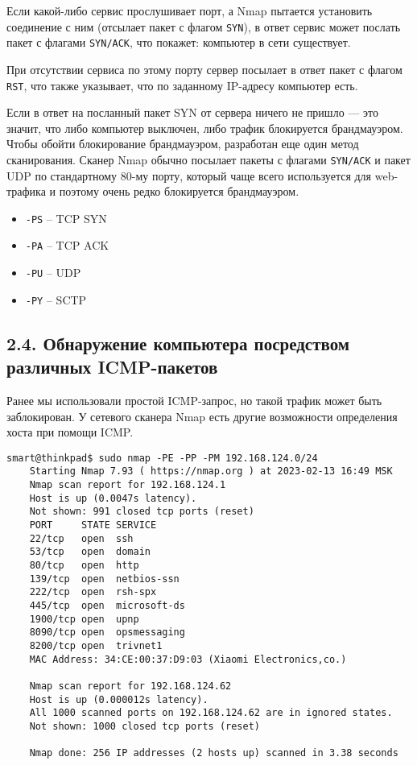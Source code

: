 Если какой-либо сервис прослушивает порт, а Nmap пытается установить соединение с ним (отсылает пакет с флагом \texttt{SYN}), в ответ сервис может послать пакет с флагами \texttt{SYN/ACK}, что покажет: компьютер в сети существует.

При отсутствии сервиса по этому порту сервер посылает в ответ пакет с флагом \texttt{RST}, что также указывает, что по заданному IP-адресу компьютер есть.

Если в ответ на посланный пакет SYN от сервера ничего не пришло — это значит, что либо компьютер выключен, либо трафик блокируется брандмауэром. Чтобы обойти блокирование брандмауэром, разработан еще один метод сканирования. Сканер Nmap обычно посылает пакеты с флагами \texttt{SYN/ACK} и пакет UDP по стандартному 80-му порту, который чаще всего используется для web-трафика и поэтому очень редко блокируется брандмауэром.

\begin{itemize}
    \item \texttt{-PS} -- TCP SYN
    \item \texttt{-PA} -- TCP ACK
    \item \texttt{-PU} -- UDP
    \item \texttt{-PY} -- SCTP
\end{itemize}

\subsection*{2.4. Обнаружение компьютера посредством различных ICMP-пакетов}

Ранее мы использовали простой ICMP-запрос, но такой трафик может быть заблокирован. У сетевого сканера Nmap есть другие возможности определения хоста при помощи ICMP.


\begin{Verbatim}[frame=single]
    smart@thinkpad$ sudo nmap -PE -PP -PM 192.168.124.0/24
    Starting Nmap 7.93 ( https://nmap.org ) at 2023-02-13 16:49 MSK
    Nmap scan report for 192.168.124.1
    Host is up (0.0047s latency).
    Not shown: 991 closed tcp ports (reset)
    PORT     STATE SERVICE
    22/tcp   open  ssh
    53/tcp   open  domain
    80/tcp   open  http
    139/tcp  open  netbios-ssn
    222/tcp  open  rsh-spx
    445/tcp  open  microsoft-ds
    1900/tcp open  upnp
    8090/tcp open  opsmessaging
    8200/tcp open  trivnet1
    MAC Address: 34:CE:00:37:D9:03 (Xiaomi Electronics,co.)

    Nmap scan report for 192.168.124.62
    Host is up (0.000012s latency).
    All 1000 scanned ports on 192.168.124.62 are in ignored states.
    Not shown: 1000 closed tcp ports (reset)

    Nmap done: 256 IP addresses (2 hosts up) scanned in 3.38 seconds
\end{Verbatim}

